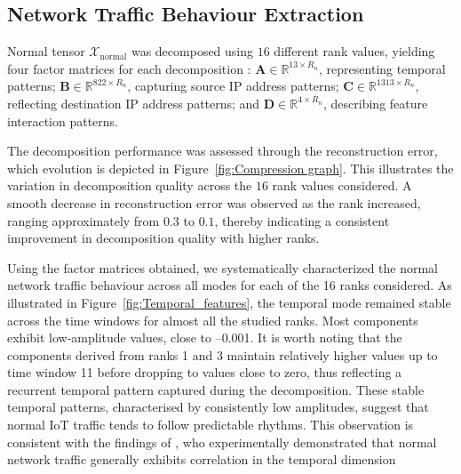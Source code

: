 \documentclass[pdflatex,sn-mathphys-num]{sn-jnl}
\theoremstyle{thmstyleone}
\theoremstyle{thmstyletwo}
\theoremstyle{thmstylethree}
\begin{document}
\subsection{Network Traffic Behaviour Extraction}
Normal tensor $\mathcal{X}_{\text{normal}}$ was decomposed using $16$ different rank values, yielding four factor matrices for each decomposition : $\mathbf{A} \in \mathbb{R}^{13 \times R_n}$, representing temporal patterns; $\mathbf{B} \in \mathbb{R}^{822 \times R_n}$, capturing source IP address patterns; $\mathbf{C} \in \mathbb{R}^{1313 \times R_n}$, reflecting destination IP address patterns; and $\mathbf{D} \in \mathbb{R}^{4 \times R_n}$, describing feature interaction patterns. 

The decomposition performance was assessed through the reconstruction error, which evolution is depicted in Figure~\ref{fig:Compression graph}. This illustrates the variation in decomposition quality across the $16$ rank values considered. A smooth decrease in reconstruction error was observed as the rank increased, ranging approximately from $0.3$ to $0.1$, thereby indicating a consistent improvement in decomposition quality with higher ranks.

Using the factor matrices obtained, we systematically characterized the normal network traffic behaviour across all modes for each of the 16 ranks considered. As illustrated in Figure~\ref{fig:Temporal_features}, the temporal mode remained stable across the time windows for almost all the studied ranks. Most components exhibit low-amplitude values, close to –0.001. It is worth noting that the components derived from ranks 1 and 3 maintain relatively higher values up to time window 11 before dropping to values close to zero, thus reflecting a recurrent temporal pattern captured during the decomposition. These stable temporal patterns, characterised by consistently low amplitudes, suggest that normal IoT traffic tends to follow predictable rhythms. This observation is consistent with the findings of \cite{kun2016accurate}, who experimentally demonstrated that normal network traffic generally exhibits correlation in the temporal dimension
\end{document}
